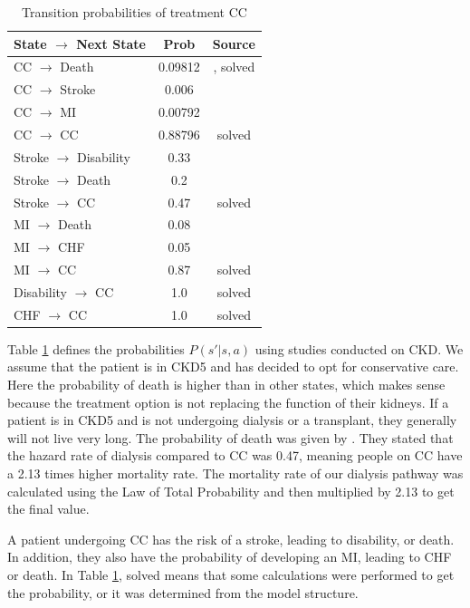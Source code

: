 \documentclass[10pt,twocolumn]{article}
\begin{document}
\begin{table}[ht]
  \centering
  \caption{Transition probabilities of treatment CC}
  \label{tab:transit1}
  \begin{tabularx}{\columnwidth}{X c c} 
      \toprule
 State \(\rightarrow\) Next State & Prob & Source \\ 
      \midrule
 CC \(\rightarrow\) Death & 0.09812 & \cite{survival}, solved \\
 CC \(\rightarrow\) Stroke & 0.006 & \cite{ckdmodel} \\
 CC \(\rightarrow\) MI & 0.00792 & \cite{ckdmodel} \\
 CC \(\rightarrow\) CC & 0.88796 & solved \\

 Stroke \(\rightarrow\) Disability & 0.33 & \cite{ckdmodel} \\
 Stroke \(\rightarrow\) Death & 0.2 & \cite{ckdmodel} \\
 Stroke \(\rightarrow\) CC & 0.47 & solved \\

 MI \(\rightarrow\) Death & 0.08 & \cite{ckdmodel} \\
 MI \(\rightarrow\) CHF & 0.05 & \cite{ckdmodel} \\
 MI \(\rightarrow\) CC & 0.87 & solved \\

 Disability \(\rightarrow\) CC & 1.0 & solved \\
 CHF \(\rightarrow\) CC & 1.0 & solved \\
      \bottomrule
  \end{tabularx}
\end{table}

Table \ref{tab:transit1} defines the probabilities \(P(s' | s, a)\) using studies conducted on CKD. We assume that the patient is in CKD5 and has decided to opt for conservative care. Here the probability of death is higher than in other states, which makes sense because the treatment option is not replacing the function of their kidneys. If a patient is in CKD5 and is not undergoing dialysis or a transplant, they generally will not live very long. The probability of death was given by \cite{survival}. They stated that the hazard rate of dialysis compared to CC was 0.47, meaning people on CC have a 2.13 times higher mortality rate. The mortality rate of our dialysis pathway was calculated using the Law of Total Probability and then multiplied by 2.13 to get the final value.

A patient undergoing CC has the risk of a stroke, leading to disability, or death. In addition, they also have the probability of developing an MI, leading to CHF or death. In Table \ref{tab:transit1}, solved means that some calculations were performed to get the probability, or it was determined from the model structure.
\end{document}
